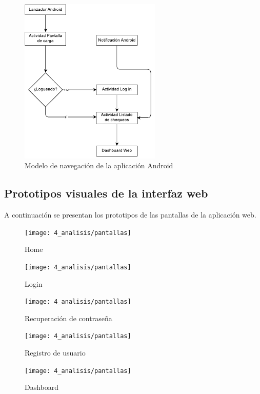 \begin{figure}[H]
  \centering
  \includegraphics[width=0.6\textwidth]{4_analisis/diagrama_navegacion_android}
  \caption{Modelo de navegación de la aplicación Android}
  \label{fig:modelo-navegacion-android}
\end{figure}

\subsection{Prototipos visuales de la interfaz web}

A continuación se presentan los prototipos de las pantallas de la aplicación
web.

\begin{figure}[htbp]
  \centering
  \texttt{[image: 4\_analisis/pantallas]}
  \caption{Home}
\end{figure}

\begin{figure}[htbp]
  \centering
  \texttt{[image: 4\_analisis/pantallas]}
  \caption{Login}
\end{figure}

\begin{figure}[htbp]
  \centering
  \texttt{[image: 4\_analisis/pantallas]}
  \caption{Recuperación de contraseña}
\end{figure}

\begin{figure}[htbp]
  \centering
  \texttt{[image: 4\_analisis/pantallas]}
  \caption{Registro de usuario}
\end{figure}

\begin{figure}[htbp]
  \centering
  \texttt{[image: 4\_analisis/pantallas]}
  \caption{Dashboard}
\end{figure}

